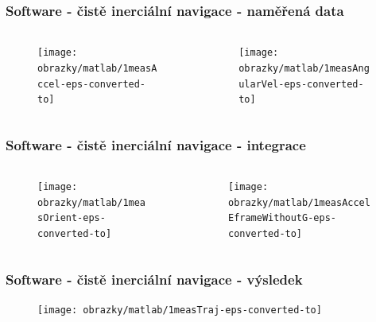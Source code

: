 \documentclass[%
  12pt,       				%
	t,                  %
	aspectratio=1610,   %
	unicode,						%
]{beamer}				    	%
\begin{document}
\begin{frame} 
	\frametitle{Software - čistě inerciální navigace - naměřená data}
	\begin{columns}[T] 								%
		\begin{column}{0.5\textwidth}		%
		\begin{figure}%
		\centering
		\texttt{[image: obrazky/matlab/1measAccel-eps-converted-to]}
		\end{figure}

		\end{column}
		\begin{column}{0.5\textwidth}		%
		\begin{figure}%
		\centering
		\texttt{[image: obrazky/matlab/1measAngularVel-eps-converted-to]}
		\end{figure}
		\end{column}
	\end{columns}	
\end{frame}

\begin{frame} 
	\frametitle{Software - čistě inerciální navigace - integrace}
	\begin{columns}[T] 								%
		\begin{column}{0.5\textwidth}		%
		\begin{figure}%
		\centering
		\texttt{[image: obrazky/matlab/1measOrient-eps-converted-to]}
		\end{figure}

		\end{column}
		\begin{column}{0.5\textwidth}		%
		\begin{figure}%
		\centering
		\texttt{[image: obrazky/matlab/1measAccelEframeWithoutG-eps-converted-to]}
		\end{figure}
		\end{column}
	\end{columns}	
\end{frame}

\begin{frame} 
	\frametitle{Software - čistě inerciální navigace - výsledek}
	
	
		\begin{figure}%
		\centering
		\texttt{[image: obrazky/matlab/1measTraj-eps-converted-to]}
		\end{figure}

\end{frame}
\end{document}

